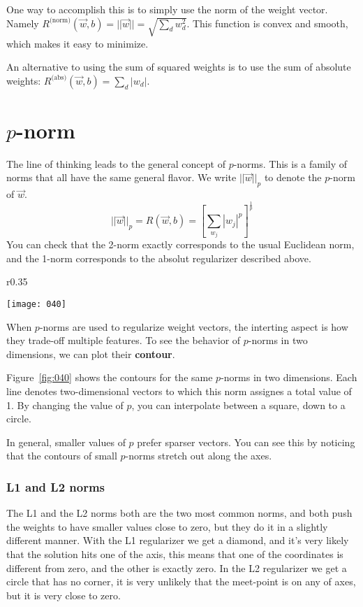 One way to accomplish this is to simply use the norm of the weight vector. Namely \(R^\text{(norm)}(\vec{w},b) = ||\vec{w}|| = \sqrt{\sum_d w_d^2}\). This function is convex and smooth, which makes it easy to minimize.

An alternative to using the sum of squared weights is to use the sum of absolute weights: \(R^\text{(abs)}(\vec{w},b) = \sum_d |w_d|\).

\section{\(p\)-norm}
The line of thinking leads to the general concept of \(p\)-norms. This is a family of norms that all have the same general flavor. We write \(||\vec{w}||_p\) to denote the \(p\)-norm of \(\vec{w}\).
\begin{equation}
    ||\vec{w}||_p = R(\vec{w},b) = \left[ {\sum_{w_j} |w_j|^p} \right]^{\frac 1 p}
\end{equation}
You can check that the 2-norm exactly corresponds to the usual Euclidean norm, and the 1-norm corresponds to the absolut regularizer described above.

\begin{wrapfigure}{r}{0.35\textwidth}
\begin{center}
    \vspace*{-20pt}
    \texttt{[image: 040]}
    \label{fig:040}
    \caption{\(p\)-norms visualized}
    \vspace*{-40pt}
\end{center}
\end{wrapfigure}

When \(p\)-norms are used to regularize weight vectors, the interting aspect is how they trade-off multiple features. To see the behavior of \(p\)-norms in two dimensions, we can plot their \textbf{contour}.

Figure~\ref{fig:040} shows the contours for the same \(p\)-norms in two dimensions. Each line denotes two-dimensional vectors to which this norm assignes a total value of 1. By changing the value of \(p\), you can interpolate between a square, down to a circle.

In general, smaller values of \(p\) prefer sparser vectors. You can see this by noticing that the contours of small \(p\)-norms stretch out along the axes.

\subsubsection{L1 and L2 norms}
The L1 and the L2 norms both are the two most common norms, and both push the weights to have smaller values close to zero, but they do it in a slightly different manner. With the L1 regularizer we get a diamond, and it's very likely that the solution hits one of the axis, this means that one of the coordinates is different from zero, and the other is exactly zero. In the L2 regularizer we get a circle that has no corner, it is very unlikely that the meet-point is on any of axes, but it is very close to zero.

